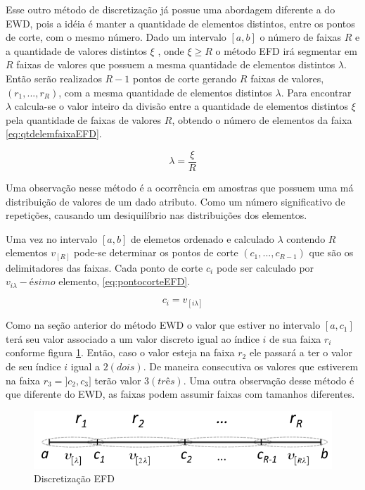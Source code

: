 Esse outro método de discretização já possue uma abordagem diferente a do EWD, pois a idéia é manter a quantidade de elementos distintos, entre os pontos de corte, com o mesmo número. Dado um intervalo ${[a,b]}$ o número de faixas ${R}$ e a quantidade de valores distintos ${\xi}$ , onde ${\xi \geqslant R}$ o método EFD irá segmentar em  ${R}$ faixas de valores que possuem a mesma quantidade de elementos distintos ${\lambda}$. Então serão realizados ${R-1}$ pontos de corte gerando ${R}$ faixas de valores, ${(r_1,...,r_R)}$, com a mesma quantidade de elementos distintos ${\lambda}$. Para encontrar ${\lambda}$ calcula-se o valor inteiro da divisão entre a quantidade de elementos distintos ${\xi}$ pela quantidade de faixas de valores ${R}$, obtendo o número de elementos da faixa \ref{eq:qtdelemfaixaEFD}.

\begin{equation}
\lambda = \frac{\xi}{R}
 \label{eq:qtdelemfaixaEFD}
\end{equation}

Uma observação nesse método é a ocorrência em amostras que possuem uma má distribuição de valores de um dado atributo. Como um número significativo de repetições, causando um desiquilíbrio nas distribuições dos elementos.

Uma vez no intervalo ${[a,b]}$ de elemetos ordenado e calculado ${\lambda}$ contendo ${R}$ elementos ${v_{[R]}}$  pode-se determinar os pontos de corte ${(c_1,...,c_{R-1})}$ que são os delimitadores das faixas. Cada ponto de corte ${c_i}$ pode ser calculado por ${v_{i\lambda}-ésimo}$ elemento, \ref{eq:pontocorteEFD}.

\begin{equation}
c_i = v_{[i\lambda]}
 \label{eq:pontocorteEFD}
\end{equation}

Como na seção anterior do método EWD o valor que estiver no intervalo ${[a,c_1]}$ terá seu valor associado a um valor discreto igual ao índice ${i}$ de sua faixa ${r_i}$ conforme figura \ref{fig:faixasEFD}. Então, caso o valor esteja na faixa ${r_2}$ ele passará a ter o valor de seu índice ${i}$ igual a ${2(dois)}$. De maneira consecutiva os valores que estiverem na faixa ${r_3=]c_2,c_3]}$ terão valor ${3(três)}$. Uma outra observação desse método é que diferente do EWD, as faixas podem assumir faixas com tamanhos diferentes.

\begin{figure}[h]
        \centering
        \includegraphics[scale=0.6]{figs/discretizacaoEFD.png}
        \caption[Discretização EFD]{Discretização EFD\footnotemark} 
        \label{fig:faixasEFD}
\end{figure} 


